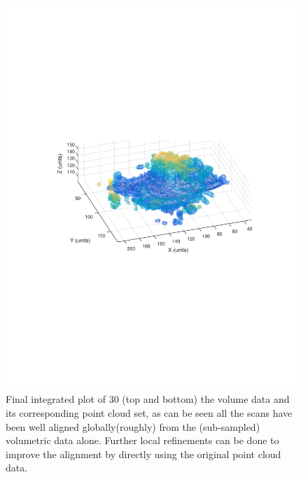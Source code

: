 \documentclass{UCF_ETD}
\begin{document}
\begin{figure}[H]
\begin{center}
\includegraphics[scale=0.6]{RobustRegistration/IntegratedPlotOf30ScansPointCloud}
\caption{ Final integrated plot of $30$ (top and bottom) the volume data and its corresponding point cloud set, as can be seen all the scans have been well aligned globally(roughly) from the (sub-sampled) volumetric data alone. Further local refinements can be done to improve the alignment by directly using the original point cloud data. }
\label{IntegratedPlot30Scans.fig}
\end{center}
\end{figure}
\end{document}
